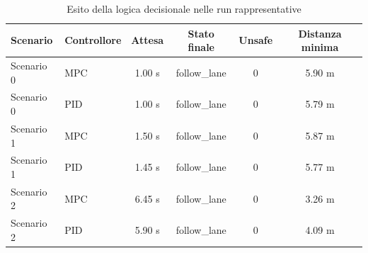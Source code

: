 \begin{table}[H]
    \centering
    \caption{Esito della logica decisionale nelle run rappresentative}
    \begin{tabular}{llcccc}
        \toprule
        \textbf{Scenario} & \textbf{Controllore} & \textbf{Attesa} & \textbf{Stato finale} & \textbf{Unsafe} & \textbf{Distanza minima} \\
        \midrule
        Scenario 0 & MPC & 1.00 s & follow_lane & 0 & 5.90 m \\
        Scenario 0 & PID & 1.00 s & follow_lane & 0 & 5.79 m \\
        Scenario 1 & MPC & 1.50 s & follow_lane & 0 & 5.87 m \\
        Scenario 1 & PID & 1.45 s & follow_lane & 0 & 5.77 m \\
        Scenario 2 & MPC & 6.45 s & follow_lane & 0 & 3.26 m \\
        Scenario 2 & PID & 5.90 s & follow_lane & 0 & 4.09 m \\
        \bottomrule
    \end{tabular}
\end{table}
